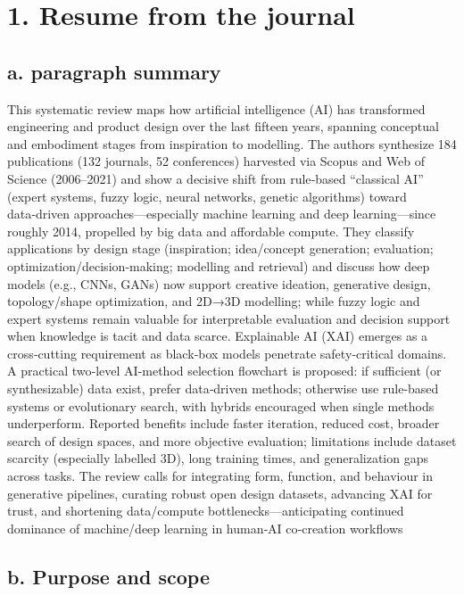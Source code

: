 \documentclass{article}
\begin{document}
\section*{1. Resume from the journal}
\subsection*{a. paragraph summary}
This systematic review maps how artificial intelligence (AI) has transformed engineering and product design over the last fifteen years, spanning conceptual and embodiment stages from inspiration to modelling. The authors synthesize 184 publications (132 journals, 52 conferences) harvested via Scopus and Web of Science (2006–2021) and show a decisive shift from rule‑based “classical AI” (expert systems, fuzzy logic, neural networks, genetic algorithms) toward data‑driven approaches—especially machine learning and deep learning—since roughly 2014, propelled by big data and affordable compute. They classify applications by design stage (inspiration; idea/concept generation; evaluation; optimization/decision‑making; modelling and retrieval) and discuss how deep models (e.g., CNNs, GANs) now support creative ideation, generative design, topology/shape optimization, and 2D→3D modelling; while fuzzy logic and expert systems remain valuable for interpretable evaluation and decision support when knowledge is tacit and data scarce. Explainable AI (XAI) emerges as a cross‑cutting requirement as black‑box models penetrate safety‑critical domains. A practical two‑level AI‑method selection flowchart is proposed: if sufficient (or synthesizable) data exist, prefer data‑driven methods; otherwise use rule‑based systems or evolutionary search, with hybrids encouraged when single methods underperform. Reported benefits include faster iteration, reduced cost, broader search of design spaces, and more objective evaluation; limitations include dataset scarcity (especially labelled 3D), long training times, and generalization gaps across tasks. The review calls for integrating form, function, and behaviour in generative pipelines, curating robust open design datasets, advancing XAI for trust, and shortening data/compute bottlenecks—anticipating continued dominance of machine/deep learning in human‑AI co‑creation workflows

\subsection*{b. Purpose and scope}
\end{document}
